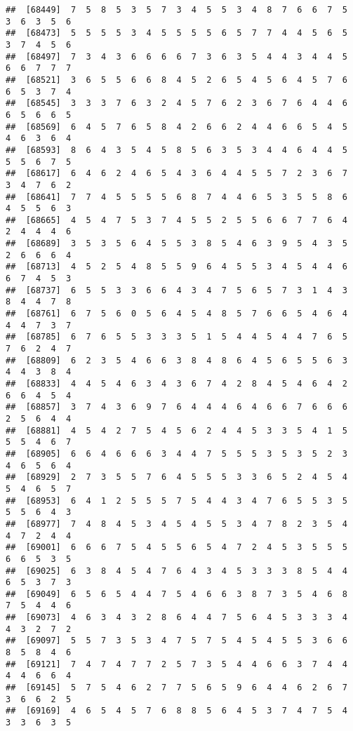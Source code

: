 \documentclass[
]{book}
\begin{document}
\begin{verbatim}
##  [68449]  7  5  8  5  3  5  7  3  4  5  5  3  4  8  7  6  6  7  5  3  6  3  5  6
##  [68473]  5  5  5  5  3  4  5  5  5  5  6  5  7  7  4  4  5  6  5  3  7  4  5  6
##  [68497]  7  3  4  3  6  6  6  6  7  3  6  3  5  4  4  3  4  4  5  6  6  7  7  7
##  [68521]  3  6  5  5  6  6  8  4  5  2  6  5  4  5  6  4  5  7  6  6  5  3  7  4
##  [68545]  3  3  3  7  6  3  2  4  5  7  6  2  3  6  7  6  4  4  6  6  5  6  6  5
##  [68569]  6  4  5  7  6  5  8  4  2  6  6  2  4  4  6  6  5  4  5  4  6  3  6  4
##  [68593]  8  6  4  3  5  4  5  8  5  6  3  5  3  4  4  6  4  4  5  5  5  6  7  5
##  [68617]  6  4  6  2  4  6  5  4  3  6  4  4  5  5  7  2  3  6  7  3  4  7  6  2
##  [68641]  7  7  4  5  5  5  5  6  8  7  4  4  6  5  3  5  5  8  6  4  5  5  6  3
##  [68665]  4  5  4  7  5  3  7  4  5  5  2  5  5  6  6  7  7  6  4  2  4  4  4  6
##  [68689]  3  5  3  5  6  4  5  5  3  8  5  4  6  3  9  5  4  3  5  2  6  6  6  4
##  [68713]  4  5  2  5  4  8  5  5  9  6  4  5  5  3  4  5  4  4  6  6  7  4  5  3
##  [68737]  6  5  5  3  3  6  6  4  3  4  7  5  6  5  7  3  1  4  3  8  4  4  7  8
##  [68761]  6  7  5  6  0  5  6  4  5  4  8  5  7  6  6  5  4  6  4  4  4  7  3  7
##  [68785]  6  7  6  5  5  3  3  3  5  1  5  4  4  5  4  4  7  6  5  7  6  2  4  7
##  [68809]  6  2  3  5  4  6  6  3  8  4  8  6  4  5  6  5  5  6  3  4  4  3  8  4
##  [68833]  4  4  5  4  6  3  4  3  6  7  4  2  8  4  5  4  6  4  2  6  6  4  5  4
##  [68857]  3  7  4  3  6  9  7  6  4  4  4  6  4  6  6  7  6  6  6  2  5  6  4  4
##  [68881]  4  5  4  2  7  5  4  5  6  2  4  4  5  3  3  5  4  1  5  5  5  4  6  7
##  [68905]  6  6  4  6  6  6  3  4  4  7  5  5  5  3  5  3  5  2  3  4  6  5  6  4
##  [68929]  2  7  3  5  5  7  6  4  5  5  5  3  3  6  5  2  4  5  4  5  4  6  5  7
##  [68953]  6  4  1  2  5  5  5  7  5  4  4  3  4  7  6  5  5  3  5  5  5  6  4  3
##  [68977]  7  4  8  4  5  3  4  5  4  5  5  3  4  7  8  2  3  5  4  4  7  2  4  4
##  [69001]  6  6  6  7  5  4  5  5  6  5  4  7  2  4  5  3  5  5  5  6  6  5  3  5
##  [69025]  6  3  8  4  5  4  7  6  4  3  4  5  3  3  3  8  5  4  4  6  5  3  7  3
##  [69049]  6  5  6  5  4  4  7  5  4  6  6  3  8  7  3  5  4  6  8  7  5  4  4  6
##  [69073]  4  6  3  4  3  2  8  6  4  4  7  5  6  4  5  3  3  3  4  4  3  2  7  2
##  [69097]  5  5  7  3  5  3  4  7  5  7  5  4  5  4  5  5  3  6  6  8  5  8  4  6
##  [69121]  7  4  7  4  7  7  2  5  7  3  5  4  4  6  6  3  7  4  4  4  4  6  6  4
##  [69145]  5  7  5  4  6  2  7  7  5  6  5  9  6  4  4  6  2  6  7  3  6  6  2  5
##  [69169]  4  6  5  4  5  7  6  8  8  5  6  4  5  3  7  4  7  5  4  3  3  6  3  5

\end{verbatim}
\end{document}
